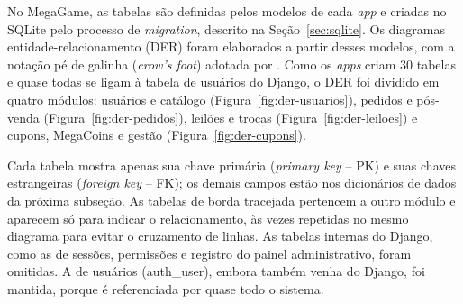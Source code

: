 \documentclass[
  12pt,
  a4paper,
  oneside,
  chapter=TITLE,
  subsection=TITLE,
  sumario=abnt-6027-2012,
  english,
  brazil
]{abntex2}
\begin{document}
No MegaGame, as tabelas são definidas pelos modelos de cada \emph{app}
e criadas no SQLite pelo processo de \emph{migration}, descrito na
Seção~\ref{sec:sqlite}. Os diagramas entidade-relacionamento (DER) foram
elaborados a partir desses modelos, com a notação pé de galinha
(\emph{crow's foot}) adotada por . Como
os \emph{apps} criam 30 tabelas e quase todas se ligam à tabela de
usuários do Django, o DER foi dividido em quatro módulos: usuários e
catálogo (Figura~\ref{fig:der-usuarios}), pedidos e pós-venda
(Figura~\ref{fig:der-pedidos}), leilões e trocas
(Figura~\ref{fig:der-leiloes}) e cupons, MegaCoins e gestão
(Figura~\ref{fig:der-cupons}).

Cada tabela mostra apenas sua chave primária (\emph{primary key} -- PK)
e suas chaves estrangeiras (\emph{foreign key} -- FK); os demais campos
estão nos dicionários de dados da próxima subseção. As tabelas de borda
tracejada pertencem a outro módulo e aparecem só para indicar o
relacionamento, às vezes repetidas no mesmo diagrama para evitar o
cruzamento de linhas. As tabelas internas do Django, como as de
sessões, permissões e registro do painel administrativo, foram
omitidas. A de usuários (auth\_user), embora também venha do Django,
foi mantida, porque é referenciada por quase todo o sistema.
\end{document}
